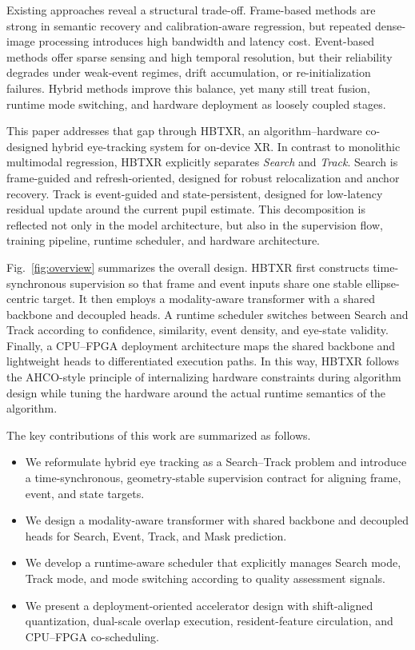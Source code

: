 \documentclass[journal]{IEEEtran}
\begin{document}
Existing approaches reveal a structural trade-off. Frame-based methods are strong in semantic recovery and calibration-aware regression, but repeated dense-image processing introduces high bandwidth and latency cost. Event-based methods offer sparse sensing and high temporal resolution, but their reliability degrades under weak-event regimes, drift accumulation, or re-initialization failures. Hybrid methods improve this balance, yet many still treat fusion, runtime mode switching, and hardware deployment as loosely coupled stages.

This paper addresses that gap through HBTXR, an algorithm--hardware co-designed hybrid eye-tracking system for on-device XR. In contrast to monolithic multimodal regression, HBTXR explicitly separates \emph{Search} and \emph{Track}. Search is frame-guided and refresh-oriented, designed for robust relocalization and anchor recovery. Track is event-guided and state-persistent, designed for low-latency residual update around the current pupil estimate. This decomposition is reflected not only in the model architecture, but also in the supervision flow, training pipeline, runtime scheduler, and hardware architecture.

Fig.~\ref{fig:overview} summarizes the overall design. HBTXR first constructs time-synchronous supervision so that frame and event inputs share one stable ellipse-centric target. It then employs a modality-aware transformer with a shared backbone and decoupled heads. A runtime scheduler switches between Search and Track according to confidence, similarity, event density, and eye-state validity. Finally, a CPU--FPGA deployment architecture maps the shared backbone and lightweight heads to differentiated execution paths. In this way, HBTXR follows the AHCO-style principle of internalizing hardware constraints during algorithm design while tuning the hardware around the actual runtime semantics of the algorithm.

The key contributions of this work are summarized as follows.
\begin{itemize}
    \item We reformulate hybrid eye tracking as a Search--Track problem and introduce a time-synchronous, geometry-stable supervision contract for aligning frame, event, and state targets.
    \item We design a modality-aware transformer with shared backbone and decoupled heads for Search, Event, Track, and Mask prediction.
    \item We develop a runtime-aware scheduler that explicitly manages Search mode, Track mode, and mode switching according to quality assessment signals.
    \item We present a deployment-oriented accelerator design with shift-aligned quantization, dual-scale overlap execution, resident-feature circulation, and CPU--FPGA co-scheduling.
\end{itemize}
\end{document}
